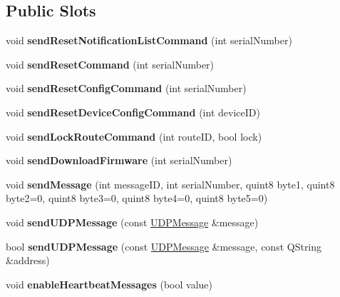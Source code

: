\subsection*{Public Slots}
\begin{DoxyCompactItemize}
\item 
\mbox{\label{class_message_broadcaster_a32dd162386ef2cf4414b7002d71ab660}} 
void {\bfseries send\+Reset\+Notification\+List\+Command} (int serial\+Number)
\item 
\mbox{\label{class_message_broadcaster_a84f20dff37d73c00f739de7f9e73c178}} 
void {\bfseries send\+Reset\+Command} (int serial\+Number)
\item 
\mbox{\label{class_message_broadcaster_ac18353484a67721b95ec1ea80f247549}} 
void {\bfseries send\+Reset\+Config\+Command} (int serial\+Number)
\item 
\mbox{\label{class_message_broadcaster_a2a6cfe9e14ba853d287b15d140ba31ce}} 
void {\bfseries send\+Reset\+Device\+Config\+Command} (int device\+ID)
\item 
\mbox{\label{class_message_broadcaster_ac58cc1d5b6bd1211079cb74154cd2f0a}} 
void {\bfseries send\+Lock\+Route\+Command} (int route\+ID, bool lock)
\item 
\mbox{\label{class_message_broadcaster_ad5aaa609256cb4d94f966069d16ddcc0}} 
void {\bfseries send\+Download\+Firmware} (int serial\+Number)
\item 
\mbox{\label{class_message_broadcaster_a74aecd50e19ec44b1f594845675e4e68}} 
void {\bfseries send\+Message} (int message\+ID, int serial\+Number, quint8 byte1, quint8 byte2=0, quint8 byte3=0, quint8 byte4=0, quint8 byte5=0)
\item 
\mbox{\label{class_message_broadcaster_ad34fa164afe43eea0a114677590d6f01}} 
void {\bfseries send\+U\+D\+P\+Message} (const \hyperlink{class_u_d_p_message}{U\+D\+P\+Message} \&message)
\item 
\mbox{\label{class_message_broadcaster_afe9d5032c449b68d33de82bd5b38d827}} 
bool {\bfseries send\+U\+D\+P\+Message} (const \hyperlink{class_u_d_p_message}{U\+D\+P\+Message} \&message, const Q\+String \&address)
\item 
\mbox{\label{class_message_broadcaster_a688f90812e544dde1795fde0d48674c2}} 
void {\bfseries enable\+Heartbeat\+Messages} (bool value)
\end{DoxyCompactItemize}
